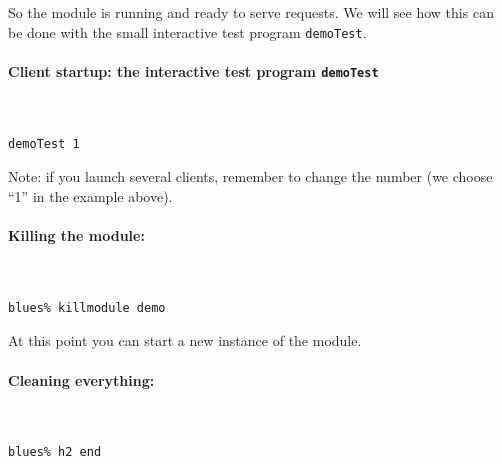 So the module is running and ready to serve requests. We will see how
this can be done with the small interactive test program \texttt{demoTest}.

\paragraph{Client startup: the interactive test program \texttt{demoTest}}

\begin{description} %
\item ~
\begin{center}\begin{cartouche}\small\begin{verbatim}
demoTest 1
\end{verbatim}\end{cartouche}\end{center}
\end{description}

Note: if  you launch several clients, remember  to  change the number (we
choose ``1'' in the example above).

\paragraph{Killing the module:}

\begin{description} %
\item ~
\begin{center}\begin{cartouche}\small\begin{verbatim}
blues% killmodule demo
\end{verbatim}\end{cartouche}\end{center}
\end{description}

At this point you can start a new instance of the module.

\paragraph{Cleaning everything:}

\begin{description} %
\item ~
\begin{center}\begin{cartouche}\small\begin{verbatim}
blues% h2 end
\end{verbatim}\end{cartouche}\end{center}
\end{description}

